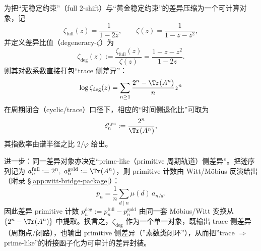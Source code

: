 \begin{remark}\label{rem:degeneracy-zeta-bridge}
为把“无稳定约束”（full $2$-shift）与“黄金稳定约束”的差异压缩为一个可计算对象，记
\[
\zeta_{\mathrm{full}}(z)=\frac{1}{1-2z},
\qquad
\zeta(z)=\frac{1}{1-z-z^2},
\]
并定义差异比值（degeneracy-$\zeta$）为
\[
\zeta_{\mathrm{deg}}(z):=\frac{\zeta_{\mathrm{full}}(z)}{\zeta(z)}
=\frac{1-z-z^2}{1-2z}.
\]
则其对数系数直接打包“trace 侧差异”：
\[
\log \zeta_{\mathrm{deg}}(z)
=\sum_{n\ge 1}\frac{2^n-\Tr(A^n)}{n}z^n
\]
在周期闭合（cyclic/trace）口径下，相应的“时间侧退化比”可取为
\[
\delta_n^{\mathrm{cyc}}:=\frac{2^n}{\Tr(A^n)},
\]
其指数率由谱半径之比 \(2/\varphi\) 给出。

进一步：同一差异对象亦决定“prime-like（primitive 周期轨道）侧差异”。把迹序列记为
\(
a_n^{\mathrm{full}}:=2^n,\ a_n^{\mathrm{gold}}:=\Tr(A^n)
\)，则 primitive 计数由 Witt/Möbius 反演给出（附录 \S\ref{app:witt-bridge-package}）：
\[
p_n=\frac{1}{n}\sum_{d\mid n}\mu(d)\,a_{n/d}.
\]
因此差异 primitive 计数
\(
p_n^{\mathrm{deg}}:=p_n^{\mathrm{full}}-p_n^{\mathrm{gold}}
\)
由同一套 Möbius/Witt 变换从 \(\{2^n-\Tr(A^n)\}\) 中提取。换言之，\(\zeta_{\mathrm{deg}}\) 作为一个单一对象，既输出 trace 侧差异（周期点/闭路），也输出 primitive 侧差异（”素数类闭环”），从而把”trace \(\Rightarrow\) prime-like”的桥接函子化为可审计的差异封装。
\end{remark}

